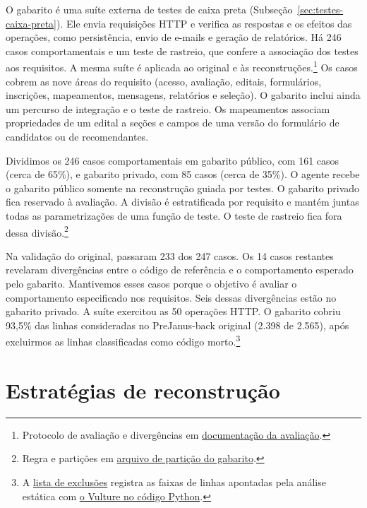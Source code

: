 \documentclass[a4paper,12pt,twoside,english,brazilian]{book}
\begin{document}
O gabarito é uma suíte externa de testes de caixa preta
(Subseção~\ref{sec:testes-caixa-preta}). Ele envia requisições HTTP e verifica as
respostas e os efeitos das operações, como persistência, envio de e-mails e
geração de relatórios. Há 246 casos comportamentais e um teste de rastreio, que confere
a associação dos testes aos requisitos. A mesma suíte é aplicada ao original
e às reconstruções.\footnote{Protocolo de avaliação e divergências em
\href{https://github.com/Educg550/tcc/blob/ee6d001c1f618419c6184644d18aa97bb33bcf9a/demos/caronte/piloto-v2/avaliacao.md}{documentação da avaliação}.}
Os casos cobrem as nove áreas do requisito (acesso, avaliação, editais,
formulários, inscrições, mapeamentos, mensagens, relatórios e seleção).
O gabarito inclui ainda um percurso de integração e o teste de rastreio.
Os mapeamentos associam propriedades de um edital a seções e campos de
uma versão do formulário de candidatos ou de recomendantes.

Dividimos os 246 casos comportamentais em gabarito público, com 161 casos
(cerca de 65\%), e gabarito privado, com 85 casos (cerca de 35\%). O agente
recebe o gabarito público somente na reconstrução guiada por testes. O
gabarito privado fica reservado à avaliação. A divisão é estratificada
por requisito e mantém juntas todas as parametrizações de uma função de
teste. O teste de rastreio fica fora dessa divisão.\footnote{Regra e partições em
\href{https://github.com/Educg550/tcc/blob/ee6d001c1f618419c6184644d18aa97bb33bcf9a/demos/caronte/piloto-v2/gabarito/split.json}{arquivo de partição do gabarito}.}

Na validação do original, passaram 233 dos 247 casos. Os 14 casos restantes
revelaram divergências entre o código de referência e o comportamento
esperado pelo gabarito. Mantivemos esses casos porque o objetivo é avaliar
o comportamento especificado nos requisitos. Seis dessas divergências
estão no gabarito privado. A suíte exercitou as 50 operações HTTP. O
gabarito cobriu 93,5\% das linhas consideradas no PreJanus-back original
(2.398 de 2.565), após
excluirmos as linhas classificadas como código morto.\footnote{A
\href{https://github.com/Educg550/tcc/blob/ee6d001c1f618419c6184644d18aa97bb33bcf9a/demos/caronte/codigo-morto.json}{lista de exclusões}
registra as faixas de linhas apontadas pela análise estática com
\href{https://github.com/Educg550/tcc/blob/ee6d001c1f618419c6184644d18aa97bb33bcf9a/demos/caronte/codigo_morto.py}{o Vulture no código Python}.}

\section{Estratégias de reconstrução}
\label{sec:prejanus-estrategias}
\end{document}
